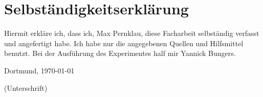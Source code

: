 \section{Selbständigkeitserklärung}

Hiermit erkläre ich, dass ich, Max Pernklau, diese Facharbeit selbständig
verfasst und angefertigt habe. Ich habe nur die angegebenen Quellen und
Hilfsmittel benutzt. Bei der Ausführung des Experimentes half mir Yannick Bungers.

\vspace{1cm}\noindent
Dortmund, \today \quad
\begin{minipage}[t]{6cm} %
\dotfill 
\begin{center}
 \small (Unterschrift) 
\end{center}
\end{minipage}